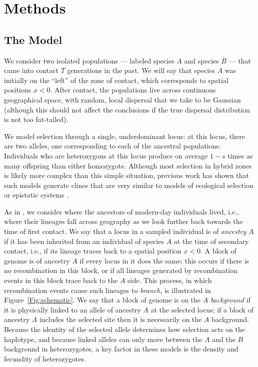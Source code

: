 \documentclass[11pt,letterpaper]{article}
\begin{document}
\section*{Methods}

\subsection*{The Model}

We consider two isolated populations
--- labeled species $A$ and species $B$ ---   %
that came into contact $T$ generations in the past.  
We will say that species $A$ was initially on the ``left'' of the zone of contact, which corresponds to spatial positions $x<0$.  
After contact, the populations live across continuous geographical space,
with random, local dispersal that we take to be Gaussian
(although this should not affect the conclusions if the true dispersal distribution is not too fat-tailed).

We model selection through a single, underdominant locus:
at this locus, there are two alleles, one corresponding to each of the ancestral populations.
Individuals who are heterozygous at this locus produce on average $1-s$ times as many offspring than either homozygote.
Although most selection in hybrid zones is likely more complex than this simple situation, 
previous work has shown that such models generate clines that are very similar to models of ecological selection or epistatic systems \citep{Kruuk1999,barton2000epistasis}.

As in \citet{sedghifar2015spatial}, we consider where the ancestors of modern-day individuals lived,
i.e., where their lineages fall across geography as we look further back towards the time of first contact.
We say that a locus in a sampled individual is of \emph{ancestry} $A$ if it has been inherited from an individual of species $A$ at the time of secondary contact,
i.e., if its lineage traces back to a spatial position $x<0$.
A block of genome is of ancestry $A$ if every locus in it does the same; 
	this occurs if there is no recombination in this block, or if all lineages generated by recombination events 
	in this block trace back to the $A$ side. 
This process, in which recombination events cause such lineages to \emph{branch},
is illustrated in Figure~\ref{Fig:schematic}.
We say that a block of genome is on the $A$ \emph{background} if it is physically linked to an allele of ancestry $A$ at the selected locus;
if a block of ancestry $A$ includes the selected site then it is necessarily on the $A$ background.
Because the identity of the selected allele determines how selection acts on the haplotype,
and because linked alleles can only move between the $A$ and the $B$ background in heterozygotes, 
a key factor in these models is the density and fecundity of heterozygotes.
\end{document}
